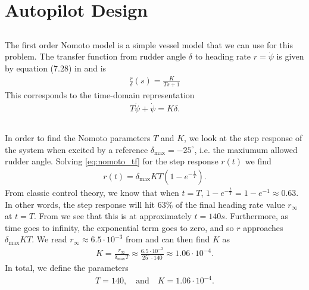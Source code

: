 \section{Autopilot Design}
\subsection{}
The first order Nomoto model is a simple vessel model that we can use for this problem. The transfer function from rudder angle $\delta$ to heading rate $r = \dot \psi$ is given by equation (7.28) in \cite{Fossen2011} and is
\begin{equation}\begin{aligned}
\label{eq:nomoto_tf}
\frac{r}{\delta}(s) = \frac{K}{Ts + 1}
\end{aligned}\end{equation}
This corresponds to the time-domain representation
\begin{equation}\begin{aligned}
T \ddot \psi + \dot \psi = K \delta.
\end{aligned}\end{equation}

\subsection{}
In order to find the Nomoto parameters $T$ and $K$, we look at the step response of the system when excited by a reference $\delta_{\text{max}} = -25^{\circ}$, i.e. the maxiumum allowed rudder angle. Solving \eqref{eq:nomoto_tf} for the step response $r(t)$ we find
\begin{equation}\begin{aligned}
r(t) = \delta_{\text{max}} KT(1 - e^{-\frac{t}{T}}).
\end{aligned}\end{equation}
From classic control theory, we know that when $t = T$, $1 - e^{-\frac{t}{T}} = 1 - e^{-1} \approx 0.63$. In other words, the step response will hit $63\%$ of the final heading rate value $r_{\infty}$ at $t = T$. From  we see that this is at approximately $t = 140s$. Furthermore, as time goes to infinity, the exponential term goes to zero, and so $r$ approaches $\delta_{\text{max}} K T$. We read $r_\infty \approx 6.5 \cdot 10^{-3}$ from  and can then find $K$ as
\begin{equation}\begin{aligned}
K = \frac{r_{\infty}}{\delta_{\text{max}} T} \approx \frac{6.5 \cdot 10^{-3}}{25^{\circ} \cdot 140} \approx 1.06 \cdot 10^{-4}.
\end{aligned}\end{equation}
In total, we define the parameters
\begin{equation}\begin{aligned}
T = 140, \quad \text{and} \quad K = 1.06 \cdot 10^{-4}.
\end{aligned}\end{equation}

